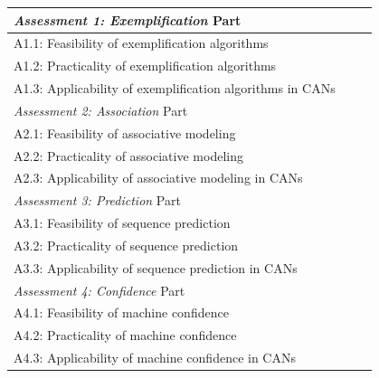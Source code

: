 			\begin{table}[!h]
				\centering
				\renewcommand{\arraystretch}{1.2}
				\begin{tabular}{p{0.8\linewidth}}
					\textit{Assessment 1: Exemplification} \hfill Part \RomanNumeralCaps{1}\\
					\hline
					\hspace{4pt} A1.1: Feasibility of exemplification algorithms \\
					\hspace{4pt} A1.2: Practicality of exemplification algorithms \\
					\hspace{4pt} A1.3: Applicability of exemplification algorithms in CANs \\[12pt]
					
					\textit{Assessment 2: Association} \hfill Part \RomanNumeralCaps{2}\\
					\hline
					\hspace{4pt} A2.1: Feasibility of associative modeling \\					
					\hspace{4pt} A2.2: Practicality of associative modeling \\
					\hspace{4pt} A2.3: Applicability of associative modeling in CANs \\[12pt]
					
					\textit{Assessment 3: Prediction} \hfill Part \RomanNumeralCaps{3}\\
					\hline
					\hspace{4pt} A3.1: Feasibility of sequence prediction \\					
					\hspace{4pt} A3.2: Practicality of sequence prediction \\
					\hspace{4pt} A3.3: Applicability of sequence prediction in CANs \\[12pt]
					
					\textit{Assessment 4: Confidence} \hfill Part \RomanNumeralCaps{4}\\
					\hline
					\hspace{4pt} A4.1: Feasibility of machine confidence \\					
					\hspace{4pt} A4.2: Practicality of machine confidence \\
					\hspace{4pt} A4.3: Applicability of machine confidence in CANs \\[12pt]
					

\end{tabular}
\end{table}
